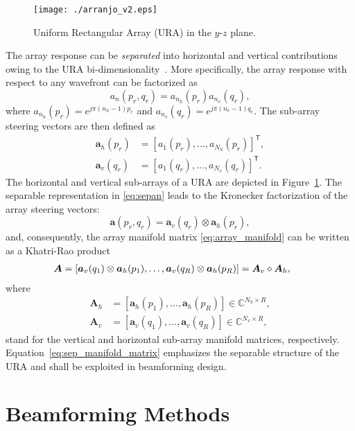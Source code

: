 \documentclass{cta-author}
\newcommand{\bmm}[1]{\ensuremath{\mathbb{#1}}}				%
\newcommand{\tran}{\mathsf{T}}						%
\begin{document}
\begin{figure}[t]
	\centering
	\texttt{[image: ./arranjo\_v2.eps]}
	\caption{Uniform Rectangular Array (URA) in the $y$-$z$ plane.}
	\label{fig:array}
\end{figure}

The array response can be \emph{separated} into horizontal and vertical contributions owing to the URA bi-dimensionality~\cite{van_trees_optimum_2002}. More specifically, the array response with respect to any wavefront can be factorized as 
\begin{equation} \label{eq:sepan}
a_n(p_r, q_r) = a_{n_h}(p_r) a_{n_v}(q_r),
\end{equation}
where $a_{n_h}(p_r) = e^{j \pi (n_h-1) p_r}$ and $a_{n_v}(q_r) = e^{j \pi (n_v-1) q_r}$. The sub-array steering vectors are then defined as
\begin{align}
\bm{a}_h(p_r) &= \left[ a_1(p_r), \ldots, a_{N_h}(p_r) \right]^\tran,\\
\bm{a}_v(q_r) &= \left[ a_1(q_r), \ldots, a_{N_v}(q_r) \right]^\tran.
\end{align}
The horizontal and vertical sub-arrays of a URA are depicted in Figure~\ref{fig:array}. The separable representation in \eqref{eq:sepan} leads to the Kronecker factorization of the array steering vectors: 
\begin{equation}
\bm{a}(p_r, q_r) = \bm{a}_v(q_r) \otimes \bm{a}_h(p_r),
\end{equation}
and, consequently, the array manifold matrix \eqref{eq:array_manifold} can be written as a Khatri-Rao product
	\begin{align}
		\bm{A} &= \left[ \bm{a}_v(q_1) \otimes \bm{a}_h(p_1), \ldots, \bm{a}_v(q_R) \otimes \bm{a}_h(p_R) \right]= \bm{A}_v \diamond \bm{A}_h, \hspace{0.25cm} \label{eq:sep_manifold_matrix}
	\end{align}
where 
\begin{align}
\bm{A}_h &= \left[ \bm{a}_h(p_1),\ldots, \bm{a}_h(p_R)\right] \in \bmm{C}^{N_h \times R},\\
\bm{A}_v &= \left[ \bm{a}_v(q_1),\ldots,\bm{a}_v(q_R) \right] \in \bmm{C}^{N_v \times R},
\end{align}
stand for the vertical and horizontal sub-array manifold matrices, respectively. Equation~\eqref{eq:sep_manifold_matrix} emphasizes the separable structure of the URA and shall be exploited in beamforming design.

\section{Beamforming Methods} 
\label{sec:methods}
\end{document}
